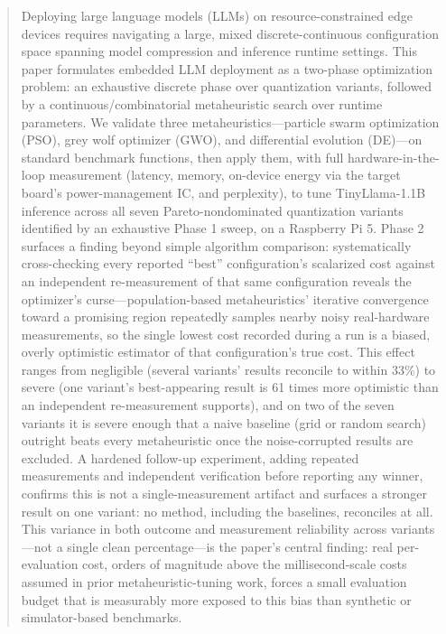 \documentclass[conference, letterpaper]{IEEEtran}
\begin{document}
\begin{abstract}
Deploying large language models (LLMs) on resource-constrained edge devices requires navigating a large, mixed discrete-continuous configuration space spanning model compression and inference runtime settings. This paper formulates embedded LLM deployment as a two-phase optimization problem: an exhaustive discrete phase over quantization variants, followed by a continuous/combinatorial metaheuristic search over runtime parameters. We validate three metaheuristics---particle swarm optimization (PSO), grey wolf optimizer (GWO), and differential evolution (DE)---on standard benchmark functions, then apply them, with full hardware-in-the-loop measurement (latency, memory, on-device energy via the target board's power-management IC, and perplexity), to tune TinyLlama-1.1B inference across all seven Pareto-nondominated quantization variants identified by an exhaustive Phase 1 sweep, on a Raspberry Pi 5. Phase 2 surfaces a finding beyond simple algorithm comparison: systematically cross-checking every reported ``best'' configuration's scalarized cost against an independent re-measurement of that same configuration reveals the optimizer's curse---population-based metaheuristics' iterative convergence toward a promising region repeatedly samples nearby noisy real-hardware measurements, so the single lowest cost recorded during a run is a biased, overly optimistic estimator of that configuration's true cost. This effect ranges from negligible (several variants' results reconcile to within 33\%) to severe (one variant's best-appearing result is 61 times more optimistic than an independent re-measurement supports), and on two of the seven variants it is severe enough that a naive baseline (grid or random search) outright beats every metaheuristic once the noise-corrupted results are excluded. A hardened follow-up experiment, adding repeated measurements and independent verification before reporting any winner, confirms this is not a single-measurement artifact and surfaces a stronger result on one variant: no method, including the baselines, reconciles at all. This variance in both outcome and measurement reliability across variants---not a single clean percentage---is the paper's central finding: real per-evaluation cost, orders of magnitude above the millisecond-scale costs assumed in prior metaheuristic-tuning work, forces a small evaluation budget that is measurably more exposed to this bias than synthetic or simulator-based benchmarks.
\end{abstract}
\end{document}
